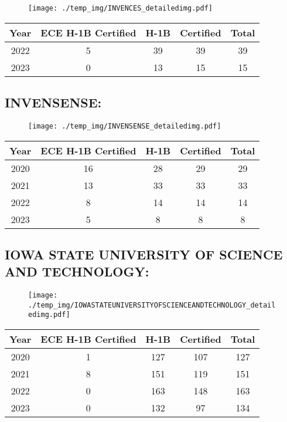 \documentclass{article}%
\begin{document}
\begin{figure}[htbp]%
\centering%
\texttt{[image: ./temp\_img/INVENCES\_detailedimg.pdf]}%
\end{figure}

%
\begin{longtable}{c|c|c|c|c}%
\hline%
Year&ECE H{-}1B Certified&H{-}1B&Certified&Total\\%
\hline%
2022&5&39&39&39\\%
\hline%
2023&0&13&15&15\\%
\hline%
\end{longtable}

%
\newpage%
\subsection{INVENSENSE:}%
\label{subsec:INVENSENSE}%
\label{INVENSENSEdetailed}%


\begin{figure}[htbp]%
\centering%
\texttt{[image: ./temp\_img/INVENSENSE\_detailedimg.pdf]}%
\end{figure}

%
\begin{longtable}{c|c|c|c|c}%
\hline%
Year&ECE H{-}1B Certified&H{-}1B&Certified&Total\\%
\hline%
2020&16&28&29&29\\%
\hline%
2021&13&33&33&33\\%
\hline%
2022&8&14&14&14\\%
\hline%
2023&5&8&8&8\\%
\hline%
\end{longtable}

%
\newpage%
\subsection{IOWA STATE UNIVERSITY OF SCIENCE AND TECHNOLOGY:}%
\label{subsec:IOWASTATEUNIVERSITYOFSCIENCEANDTECHNOLOGY}%
\label{IOWASTATEUNIVERSITYOFSCIENCEANDTECHNOLOGYdetailed}%


\begin{figure}[htbp]%
\centering%
\texttt{[image: ./temp\_img/IOWASTATEUNIVERSITYOFSCIENCEANDTECHNOLOGY\_detailedimg.pdf]}%
\end{figure}

%
\begin{longtable}{c|c|c|c|c}%
\hline%
Year&ECE H{-}1B Certified&H{-}1B&Certified&Total\\%
\hline%
2020&1&127&107&127\\%
\hline%
2021&8&151&119&151\\%
\hline%
2022&0&163&148&163\\%
\hline%
2023&0&132&97&134\\%
\hline%
\end{longtable}
\end{document}
